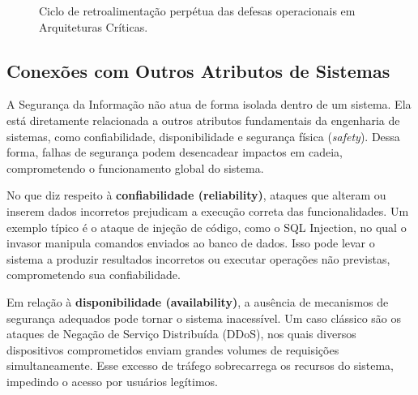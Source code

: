 \documentclass[12pt,a4paper,twoside]{report}
\begin{document}
\begin{figure}[h]
    \centering
    \caption{Ciclo de retroalimentação perpétua das defesas operacionais em Arquiteturas Críticas.}
    \label{fig:ciclo_defesa}
\end{figure}
\subsection{Conexões com Outros Atributos de Sistemas}

A Segurança da Informação não atua de forma isolada dentro de um sistema. Ela está diretamente relacionada a outros atributos fundamentais da engenharia de sistemas, como confiabilidade, disponibilidade e segurança física (\textit{safety}). Dessa forma, falhas de segurança podem desencadear impactos em cadeia, comprometendo o funcionamento global do sistema.

No que diz respeito à \textbf{confiabilidade (reliability)}, ataques que alteram ou inserem dados incorretos prejudicam a execução correta das funcionalidades. Um exemplo típico é o ataque de injeção de código, como o SQL Injection, no qual o invasor manipula comandos enviados ao banco de dados. Isso pode levar o sistema a produzir resultados incorretos ou executar operações não previstas, comprometendo sua confiabilidade.

Em relação à \textbf{disponibilidade (availability)}, a ausência de mecanismos de segurança adequados pode tornar o sistema inacessível. Um caso clássico são os ataques de Negação de Serviço Distribuída (DDoS), nos quais diversos dispositivos comprometidos enviam grandes volumes de requisições simultaneamente. Esse excesso de tráfego sobrecarrega os recursos do sistema, impedindo o acesso por usuários legítimos.
\end{document}
